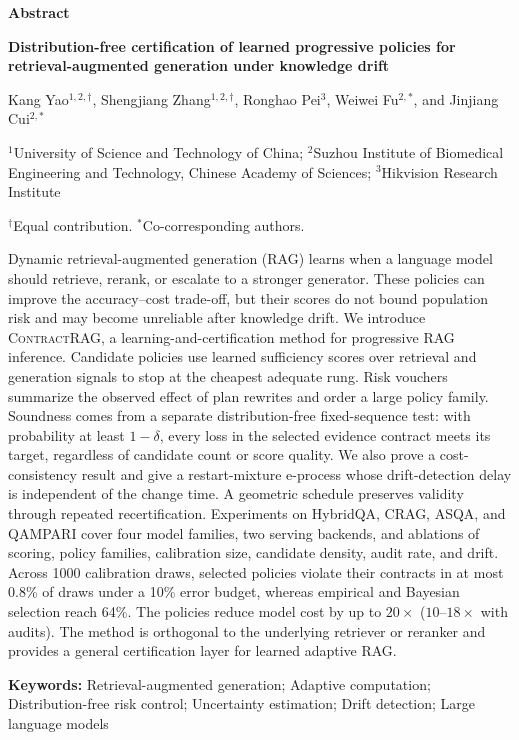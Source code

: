 \documentclass[10pt]{article}
\begin{document}
\begin{center}
{\large\bfseries Abstract\par}
\vspace{7mm}
{\Large\bfseries Distribution-free certification of learned progressive
policies for retrieval-augmented generation under knowledge drift\par}
\vspace{5mm}
{\normalsize Kang Yao$^{1,2,\dagger}$, Shengjiang Zhang$^{1,2,\dagger}$,
Ronghao Pei$^{3}$, Weiwei Fu$^{2,*}$, and Jinjiang Cui$^{2,*}$\par}
\vspace{2mm}
{\small $^{1}$University of Science and Technology of China; $^{2}$Suzhou Institute of
Biomedical Engineering and Technology, Chinese Academy of Sciences;
$^{3}$Hikvision Research Institute\par}
{\small $^{\dagger}$Equal contribution. $^{*}$Co-corresponding authors.\par}
\end{center}

\vspace{3mm}
\small
Dynamic retrieval-augmented generation (RAG) learns when a language
model should retrieve, rerank, or escalate to a stronger generator.
These policies can improve the accuracy--cost trade-off, but their
scores do not bound population risk and may become unreliable after
knowledge drift. We introduce \textsc{ContractRAG}, a
learning-and-certification method for progressive RAG inference.
Candidate policies use learned sufficiency scores over retrieval and
generation signals to stop at the cheapest adequate rung. Risk vouchers
summarize the observed effect of plan rewrites and order a large policy
family. Soundness comes from a separate distribution-free
fixed-sequence test: with probability at least $1-\delta$, every loss
in the selected evidence contract meets its target, regardless of
candidate count or score quality. We also prove a cost-consistency
result and give a restart-mixture e-process whose drift-detection delay
is independent of the change time. A geometric schedule preserves
validity through repeated recertification. Experiments on HybridQA,
CRAG, ASQA, and QAMPARI cover four model families, two serving
backends, and ablations of scoring, policy families, calibration size,
candidate density, audit rate, and drift. Across 1000 calibration draws,
selected policies violate their contracts in at most 0.8\% of draws
under a 10\% error budget, whereas empirical and Bayesian selection
reach 64\%. The policies reduce model cost by up to $20\times$
($10$--$18\times$ with audits). The method is orthogonal to the
underlying retriever or reranker and provides a general certification
layer for learned adaptive RAG.

\vspace{4mm}
\textbf{Keywords:} Retrieval-augmented generation; Adaptive computation;
Distribution-free risk control; Uncertainty estimation; Drift detection;
Large language models
\end{document}
